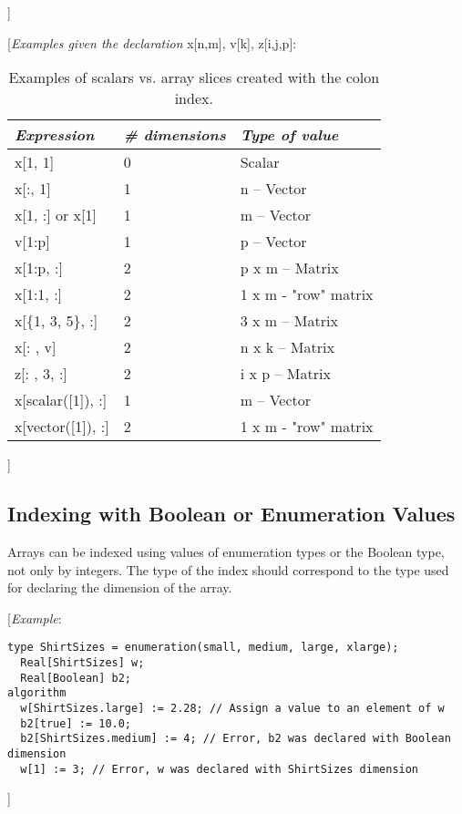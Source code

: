 {]}

{[}\emph{Examples given the declaration} x{[}n,m{]}, v{[}k{]}, z{[}i,j,p{]}:

\begin{longtable}[]{|l|l|l|}
\caption{Examples of scalars vs. array slices created with the colon index.}\\
\hline
\emph{Expression} & \emph{\# dimensions} & \emph{Type of value}\\ \hline
\endhead
x{[}1, 1{]} & 0 & Scalar\\ \hline
x{[}:, 1{]} & 1 & n -- Vector\\ \hline
x{[}1, :{]} or x{[}1{]} & 1 & m -- Vector\\ \hline
v{[}1:p{]} & 1 & p -- Vector\\ \hline
x{[}1:p, :{]} & 2 & p x m -- Matrix\\ \hline
x{[}1:1, :{]} & 2 & 1 x m - "row" matrix\\ \hline
x{[}\{1, 3, 5\}, :{]} & 2 & 3 x m -- Matrix\\ \hline
x{[}: , v{]} & 2 & n x k -- Matrix\\ \hline
z{[}: , 3, :{]} & 2 & i x p -- Matrix\\ \hline
x{[}scalar({[}1{]}), :{]} & 1 & m -- Vector\\ \hline
x{[}vector({[}1{]}), :{]} & 2 & 1 x m - "row" matrix\\ \hline

\end{longtable}

{]}

\subsection{Indexing with Boolean or Enumeration Values}

Arrays can be indexed using values of enumeration types or the Boolean
type, not only by integers. The type of the index should correspond to
the type used for declaring the dimension of the array.

{[}\emph{Example}:

\begin{lstlisting}[language=modelica]
  type ShirtSizes = enumeration(small, medium, large, xlarge);
  Real[ShirtSizes] w;
  Real[Boolean] b2;
algorithm
  w[ShirtSizes.large] := 2.28; // Assign a value to an element of w
  b2[true] := 10.0;
  b2[ShirtSizes.medium] := 4; // Error, b2 was declared with Boolean dimension
  w[1] := 3; // Error, w was declared with ShirtSizes dimension
\end{lstlisting}
{]}

